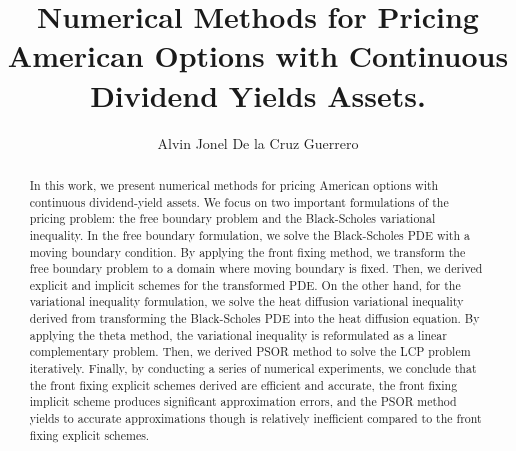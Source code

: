 \documentclass{uonmathreport}
\title{Numerical Methods for Pricing American Options with Continuous Dividend Yields Assets.}
\author{Alvin Jonel De la Cruz Guerrero}
\begin{document}
\maketitle

\begin{abstract}

  In this work, we present numerical methods for pricing American options with continuous dividend-yield assets. We focus on two important formulations of the pricing problem: the free boundary problem and the Black-Scholes variational inequality. In the free boundary formulation, we solve the Black-Scholes PDE with a moving boundary condition. By applying the front fixing method, we transform the free boundary problem to a domain where moving boundary is fixed. Then, we derived explicit and implicit schemes for the transformed PDE. On the other hand, for the variational inequality formulation, we solve the heat diffusion variational inequality derived from transforming the Black-Scholes PDE into the heat diffusion equation. By applying the theta method, the variational inequality is reformulated as a linear complementary problem. Then, we derived PSOR method to solve the LCP problem iteratively. Finally, by conducting a series of numerical experiments, we conclude that the front fixing explicit schemes derived are efficient and accurate, the front fixing implicit scheme produces significant approximation errors, and the PSOR method yields to accurate approximations though is relatively inefficient compared to the front fixing explicit schemes.
  
\end{abstract}

\setcounter{tocdepth}{3}  %
\tableofcontents 
\newpage
{}




% 


% 
\newpage

\appendix


% 
\newpage
\printbibliography
\end{document}
